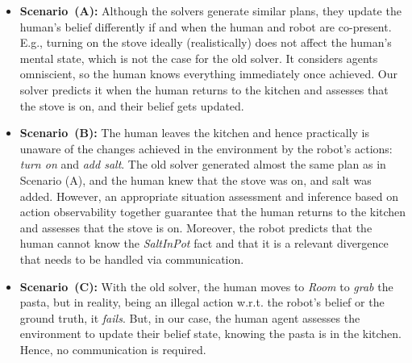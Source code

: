 \documentclass[letterpaper]{article} %
\begin{document}
\begin{itemize}
    \item \textbf{Scenario~(A):} 
    Although the solvers generate similar plans, they update the human's belief differently if and when the human and robot are co-present. E.g., turning on the stove ideally (realistically) does not affect the human's mental state, which is not the case for the old solver. It considers agents omniscient, so the human knows everything immediately once achieved. 
    Our solver predicts it when the human returns to the kitchen and assesses that the stove is {\sc on}, and their belief gets updated.
    \item \textbf{Scenario~(B):} The human leaves the kitchen and hence practically is unaware of the changes achieved in the environment by the robot's actions: {\em turn on} and {\em add salt}. The old solver generated almost the same plan as in Scenario (A), and the human knew that the stove was {\sc on}, and salt was added.
    However, an appropriate situation assessment and inference based on action observability together guarantee that the human returns to the kitchen and assesses that the stove is {\sc on}. Moreover, the robot predicts that the human cannot know the \textit{SaltInPot} fact and that it is a relevant divergence that needs to be handled via communication. 
    \item
    \textbf{Scenario~(C):}
    With the old solver, the human moves to \textit{Room} to \textit{grab} the pasta, but in reality, being an illegal action w.r.t. the robot's belief or the ground truth, it \textit{fails}. 
    But, in our case, the human agent assesses the environment to update their belief state, knowing the pasta is in the kitchen. 
    Hence, no communication is required.
\end{itemize}
\end{document}
